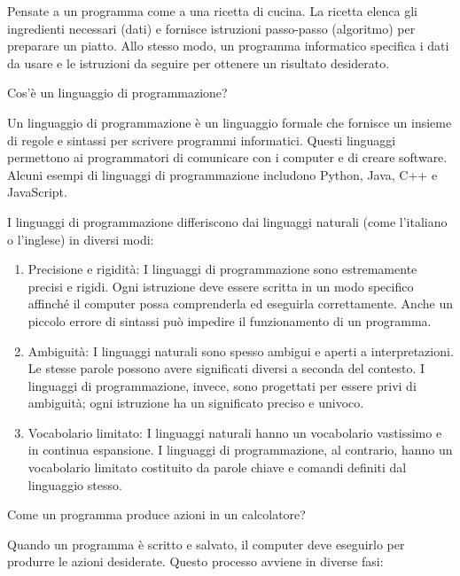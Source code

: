 \documentclass[
  letterpaper,
  DIV=11,
  numbers=noendperiod]{scrreprt}
\providecommand{\tightlist}{%
  \setlength{\itemsep}{0pt}\setlength{\parskip}{0pt}}\usepackage{longtable,booktabs,array}
\begin{document}
Pensate a un programma come a una ricetta di cucina. La ricetta elenca
gli ingredienti necessari (dati) e fornisce istruzioni passo-passo
(algoritmo) per preparare un piatto. Allo stesso modo, un programma
informatico specifica i dati da usare e le istruzioni da seguire per
ottenere un risultato desiderato.

Cos'è un linguaggio di programmazione?

Un linguaggio di programmazione è un linguaggio formale che fornisce un
insieme di regole e sintassi per scrivere programmi informatici. Questi
linguaggi permettono ai programmatori di comunicare con i computer e di
creare software. Alcuni esempi di linguaggi di programmazione includono
Python, Java, C++ e JavaScript.

I linguaggi di programmazione differiscono dai linguaggi naturali (come
l'italiano o l'inglese) in diversi modi:

\begin{enumerate}
\def\labelenumi{\arabic{enumi}.}
\tightlist
\item
  Precisione e rigidità: I linguaggi di programmazione sono estremamente
  precisi e rigidi. Ogni istruzione deve essere scritta in un modo
  specifico affinché il computer possa comprenderla ed eseguirla
  correttamente. Anche un piccolo errore di sintassi può impedire il
  funzionamento di un programma.
\item
  Ambiguità: I linguaggi naturali sono spesso ambigui e aperti a
  interpretazioni. Le stesse parole possono avere significati diversi a
  seconda del contesto. I linguaggi di programmazione, invece, sono
  progettati per essere privi di ambiguità; ogni istruzione ha un
  significato preciso e univoco.
\item
  Vocabolario limitato: I linguaggi naturali hanno un vocabolario
  vastissimo e in continua espansione. I linguaggi di programmazione, al
  contrario, hanno un vocabolario limitato costituito da parole chiave e
  comandi definiti dal linguaggio stesso.
\end{enumerate}

Come un programma produce azioni in un calcolatore?

Quando un programma è scritto e salvato, il computer deve eseguirlo per
produrre le azioni desiderate. Questo processo avviene in diverse fasi:
\end{document}

